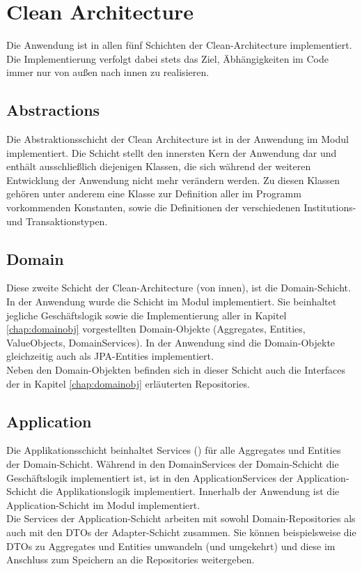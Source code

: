 \chapter{Clean Architecture}
Die Anwendung ist in allen fünf Schichten der Clean-Architecture implementiert. Die Implementierung verfolgt dabei stets das Ziel, Äbhängigkeiten im Code immer nur von außen nach innen zu realisieren.

\section{Abstractions}
Die Abstraktionsschicht der Clean Architecture ist in der Anwendung im Modul  implementiert. Die Schicht stellt den innersten Kern der Anwendung dar und enthält ausschließlich diejenigen Klassen, die sich während der weiteren Entwicklung der Anwendung nicht mehr verändern werden. Zu diesen Klassen gehören unter anderem eine Klasse zur Definition aller im Programm vorkommenden Konstanten, sowie die Definitionen der verschiedenen Institutions- und Transaktionstypen.

\section{Domain}
Diese zweite Schicht der Clean-Architecture (von innen), ist die Domain-Schicht. In der Anwendung wurde die Schicht im Modul  implementiert. Sie beinhaltet jegliche Geschäftslogik sowie die Implementierung aller in Kapitel \ref{chap:domainobj} vorgestellten Domain-Objekte (Aggregates, Entities, ValueObjects, DomainServices). In der Anwendung sind die Domain-Objekte gleichzeitig auch als JPA-Entities implementiert.\\
Neben den Domain-Objekten befinden sich in dieser Schicht auch die Interfaces der in Kapitel \ref{chap:domainobj} erläuterten Repositories.

\section{Application}
Die Applikationsschicht beinhaltet Services () für alle Aggregates und Entities der Domain-Schicht. Während in den DomainServices der Domain-Schicht die Geschäftslogik implementiert ist, ist in den ApplicationServices der Application-Schicht die Applikationslogik implementiert. Innerhalb der Anwendung ist die Application-Schicht im Modul  implementiert.\\
Die Services der Application-Schicht arbeiten mit sowohl Domain-Repositories als auch mit den DTOs der Adapter-Schicht zusammen. Sie können beispielsweise die DTOs zu Aggregates und Entities umwandeln (und umgekehrt) und diese im Anschluss zum Speichern an die Repositories weitergeben.

